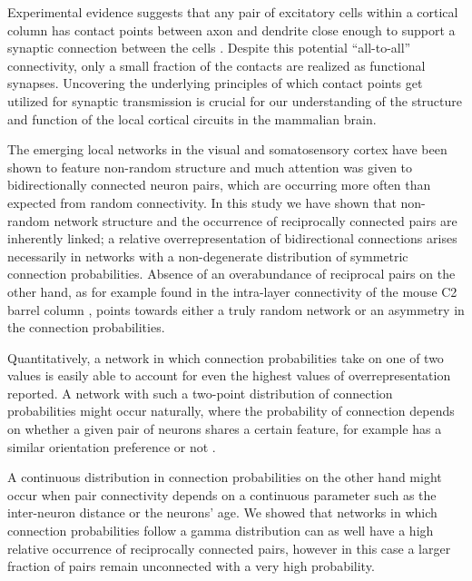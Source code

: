 

Experimental evidence suggests that any pair of excitatory cells within a cortical column has contact points between axon and dendrite close enough to support a synaptic connection between the cells \cite{Stepanyants2004,Kalisman2005}.
%
Despite this potential \enquote{all-to-all} connectivity, only a small fraction of the contacts are realized as functional synapses.
%
Uncovering the underlying principles of which contact points get utilized for synaptic transmission is crucial for our understanding of the structure and function of the local cortical circuits in the mammalian brain.


The emerging local networks in the visual and somatosensory cortex have been shown to feature non-random structure and much attention was given to bidirectionally connected neuron pairs, which are occurring more often than expected from random connectivity.
%
In this study we have shown that non-random network structure and the occurrence of reciprocally connected pairs are inherently linked; a relative overrepresentation of bidirectional connections arises necessarily in networks with a non-degenerate distribution of symmetric connection probabilities.
%
Absence of an overabundance of reciprocal pairs on the other hand, as for example found in the intra-layer connectivity of the mouse C2 barrel column \cite{Lefort2009}, points towards either a truly random network or an asymmetry in the connection probabilities. 


Quantitatively, a network in which connection probabilities take on one of two values is easily able to account for even the highest values of overrepresentation reported.
%
A network with such a two-point distribution of connection probabilities might occur naturally, where the probability of connection depends on whether a given pair of neurons shares a certain feature, for example has a similar orientation preference or not \cite{Lee2016a}.


A continuous distribution in connection probabilities on the other hand might occur when pair connectivity depends on a continuous parameter such as the inter-neuron distance or the neurons' age.
%
We showed that networks in which connection probabilities follow a gamma distribution can as well have a high relative occurrence of reciprocally connected pairs, however in this case a larger fraction of pairs remain unconnected with a very high probability.


